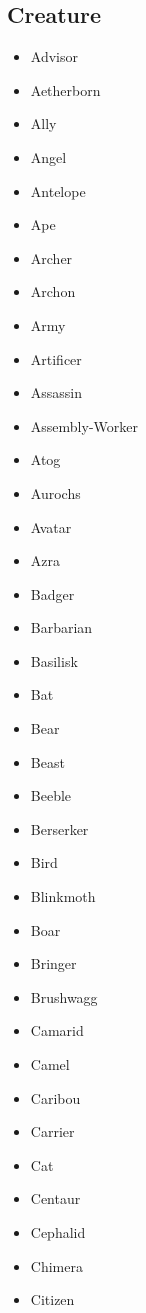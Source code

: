 \documentclass{article}
\begin{document}
\subsection{Creature}
\begin{multicols}{3}
    \begin{itemize}
        \item Advisor
        \item Aetherborn
        \item Ally
        \item Angel
        \item Antelope
        \item Ape
        \item Archer
        \item Archon
        \item Army
        \item Artificer
        \item Assassin
        \item Assembly-Worker
        \item Atog
        \item Aurochs
        \item Avatar
        \item Azra
        \item Badger
        \item Barbarian
        \item Basilisk
        \item Bat
        \item Bear
        \item Beast
        \item Beeble
        \item Berserker
        \item Bird
        \item Blinkmoth
        \item Boar
        \item Bringer
        \item Brushwagg
        \item Camarid
        \item Camel
        \item Caribou
        \item Carrier
        \item Cat
        \item Centaur
        \item Cephalid
        \item Chimera
        \item Citizen

\end{itemize}
\end{multicols}
\end{document}
